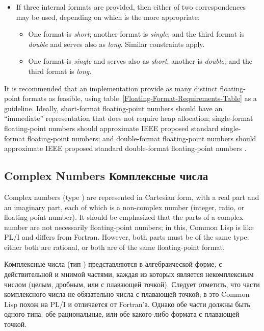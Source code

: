 \begin{itemize}
\item
If three internal formats are provided, then either of two correspondences
may be used, depending on which is the more appropriate:
\begin{itemize}
\item
One format is {\it short}; another format is {\it single}; and the third format is
{\it double} and serves also as {\it long}.  Similar constraints apply.

\item
One format is {\it single} and serves also as {\it short};
another is {\it double}; and the third format is {\it long}.
\end{itemize}
\end{itemize}

\beforenoterule
\begin{implementation}
It is recommended that an implementation
provide as many distinct floating-point formats as feasible,
using table~\ref{Floating-Format-Requirements-Table} as a guideline.
Ideally, short-format floating-point numbers should have an
``immediate'' representation that does not require heap allocation;
single-format
floating-point numbers should approximate IEEE proposed standard
single-format floating-point numbers; and double-format floating-point
numbers should approximate IEEE proposed standard double-format
floating-point numbers
\cite{IEEE-PROPOSED-FLOATING-POINT-STANDARD,IEEE-FLOATING-POINT-IMPL-GUIDE,IEEE-FLOATING-POINT-IMPL-GUIDE-ERRATA}.
\end{implementation}
\afternoterule


\subsection{Complex Numbers Комплексные числа}

Complex numbers (type )
are represented in Cartesian form, with a real part and an imaginary
part, each of which is a non-complex number (integer, ratio, or floating-point
number).  It should be emphasized that the parts of a complex
number are not necessarily floating-point numbers; in this, Common Lisp
is like PL/I and differs from Fortran.  However, both parts must
be of the same type: either both are rational, or both are of the
same floating-point format. 

Комплексные числа (тип )
представляются в алгебраической форме, с действительной и мнимой частями, каждая
из которых является некомплексным числом (целым, дробным, или с плавающей
точкой). Следует отметить, что части комплексного числа не
обязательно числа с плавающей точкой; в это Common Lisp похож на PL/I и
отличается от Fortran'а. Однако обе части должны быть одного типа: обе
рациональные, или обе какого-либо формата с плавающей точкой.

